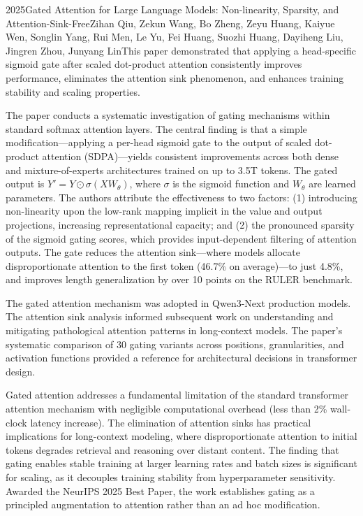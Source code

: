 
\begin{papersummary}{2025}{Gated Attention for Large Language Models: Non-linearity, Sparsity, and Attention-Sink-Free}{Zihan Qiu, Zekun Wang, Bo Zheng, Zeyu Huang, Kaiyue Wen, Songlin Yang, Rui Men, Le Yu, Fei Huang, Suozhi Huang, Dayiheng Liu, Jingren Zhou, Junyang Lin}{This paper demonstrated that applying a head-specific sigmoid gate after scaled dot-product attention consistently improves performance, eliminates the attention sink phenomenon, and enhances training stability and scaling properties.}

The paper conducts a systematic investigation of gating mechanisms within standard softmax attention layers. The central finding is that a simple modification---applying a per-head sigmoid gate to the output of scaled dot-product attention (SDPA)---yields consistent improvements across both dense and mixture-of-experts architectures trained on up to 3.5T tokens. The gated output is $Y' = Y \odot \sigma(XW_\theta)$, where $\sigma$ is the sigmoid function and $W_\theta$ are learned parameters. The authors attribute the effectiveness to two factors: (1) introducing non-linearity upon the low-rank mapping implicit in the value and output projections, increasing representational capacity; and (2) the pronounced sparsity of the sigmoid gating scores, which provides input-dependent filtering of attention outputs. The gate reduces the attention sink---where models allocate disproportionate attention to the first token (46.7\% on average)---to just 4.8\%, and improves length generalization by over 10 points on the RULER benchmark.

The gated attention mechanism was adopted in Qwen3-Next production models. The attention sink analysis informed subsequent work on understanding and mitigating pathological attention patterns in long-context models. The paper's systematic comparison of 30 gating variants across positions, granularities, and activation functions provided a reference for architectural decisions in transformer design.

Gated attention addresses a fundamental limitation of the standard transformer attention mechanism with negligible computational overhead (less than 2\% wall-clock latency increase). The elimination of attention sinks has practical implications for long-context modeling, where disproportionate attention to initial tokens degrades retrieval and reasoning over distant content. The finding that gating enables stable training at larger learning rates and batch sizes is significant for scaling, as it decouples training stability from hyperparameter sensitivity. Awarded the NeurIPS 2025 Best Paper, the work establishes gating as a principled augmentation to attention rather than an ad hoc modification.

\end{papersummary}
